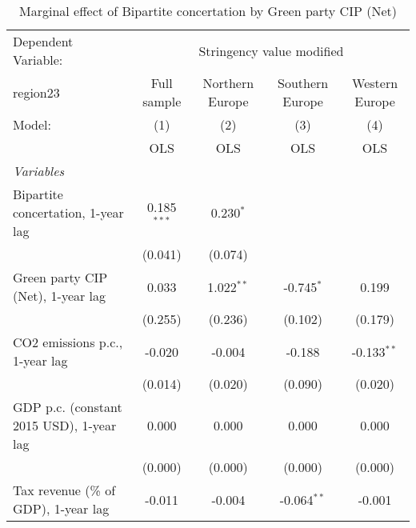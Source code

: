 
\begin{table}[htbp]
   \caption{Marginal effect of Bipartite concertation by Green party CIP (Net)}
   \centering
   \begin{tabular}{lcccc}
      \toprule
      Dependent Variable: & \multicolumn{4}{c}{Stringency value modified}\\
      region23                                                               & Full sample   & Northern Europe & Southern Europe & Western Europe \\   
      Model:                                                                 & (1)           & (2)             & (3)             & (4)\\  
                                                                             &  OLS          & OLS             & OLS             & OLS\\  
      \midrule
      \emph{Variables}\\
      Bipartite concertation, 1-year lag                                     & 0.185$^{***}$ & 0.230$^{*}$     &                 &   \\   
                                                                             & (0.041)       & (0.074)         &                 &   \\   
      Green party CIP (Net), 1-year lag                                      & 0.033         & 1.022$^{**}$    & -0.745$^{*}$    & 0.199\\   
                                                                             & (0.255)       & (0.236)         & (0.102)         & (0.179)\\   
      CO2 emissions p.c., 1-year lag                                         & -0.020        & -0.004          & -0.188          & -0.133$^{**}$\\   
                                                                             & (0.014)       & (0.020)         & (0.090)         & (0.020)\\   
      GDP p.c. (constant 2015 USD), 1-year lag                               & 0.000         & 0.000           & 0.000           & 0.000\\   
                                                                             & (0.000)       & (0.000)         & (0.000)         & (0.000)\\   
      Tax revenue (\% of GDP), 1-year lag                                    & -0.011        & -0.004          & -0.064$^{**}$   & -0.001\\   

\end{tabular}
\end{table}
